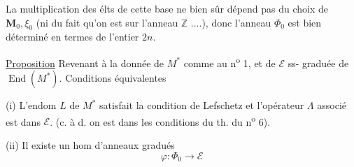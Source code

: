 
La multiplication des élts de cette base ne bien sûr dépend pas du choix de $\mathbf M_0,\xi_0$ (ni du fait qu'on est sur l'anneau $\mathbb Z$ ....), donc l'anneau $\Phi_0$ est bien déterminé en termes de l'entier  $2n$.

\uline{Proposition} Revenant à la donnée de $M^*$ comme au n\textsuperscript{o} 1, et de $\mathcal E$ ss- graduée de  $\operatorname{End}(M^*)$.
Conditions équivalentes

(i) L'endom $L$ de $M^*$ satisfait la condition de  Lefschetz et l'opérateur $\Lambda$ associé est dans $\mathcal E$.
(c. à d. on est dans les conditions du th. du n\textsuperscript{o} 6).

(ii) Il existe un hom d'anneaux gradués
\[
\varphi:\Phi_0\longrightarrow\mathcal E
\]
